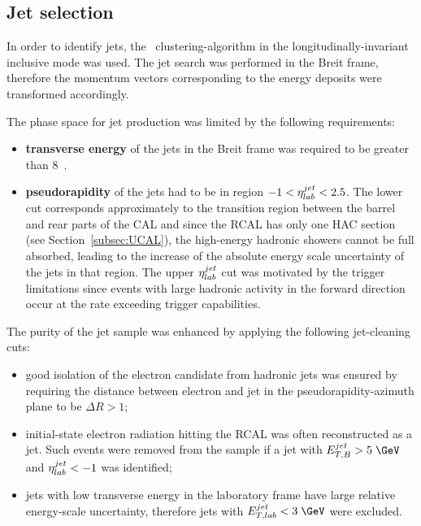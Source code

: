 \subsection{Jet selection}
\label{subsec:jetselect}
In order to identify jets, the \kt~clustering-algorithm in the longitudinally-invariant inclusive mode was used. The jet search was performed in the Breit frame, therefore the momentum vectors corresponding to the energy deposits were transformed accordingly. 

The phase space for jet production was limited by the following requirements:
\begin{itemize}
	\item \textbf{transverse energy} of the jets in the Breit frame was required to be greater than 8~\GeV.
	\item \textbf{pseudorapidity} of the jets had to be in region $-1<\mbox{$\eta^{jet}_{lab}$}<2.5$. The lower cut corresponds approximately to the transition region between the barrel and rear parts of the CAL and since the RCAL has only one HAC section (see Section~\ref{subsec:UCAL}), the high-energy hadronic showers cannot be full absorbed, leading to the increase of the absolute energy scale uncertainty of the jets in that region. The upper $\mbox{$\eta^{jet}_{lab}$}$ cut was motivated by the trigger limitations since events with large hadronic activity in the forward direction occur at the rate exceeding trigger capabilities.
	
\end{itemize}
The purity of the jet sample was enhanced by applying the following jet-cleaning cuts:

\begin{itemize}
	\item good isolation of the electron candidate from hadronic jets was ensured by requiring the distance between electron and jet in the pseudorapidity-azimuth plane to be $\Delta R > 1$;
	\item initial-state electron radiation hitting the RCAL was often reconstructed as a jet. Such events were removed from the sample if a jet with $\etjetb > 5\;\GeV$ and $\mbox{$\eta^{jet}_{lab}$} < -1$ was identified;
	\item jets with low transverse energy in the laboratory frame have large relative energy-scale uncertainty, therefore jets with $\etjetlab < 3\;\GeV$ were excluded.
\end{itemize}

